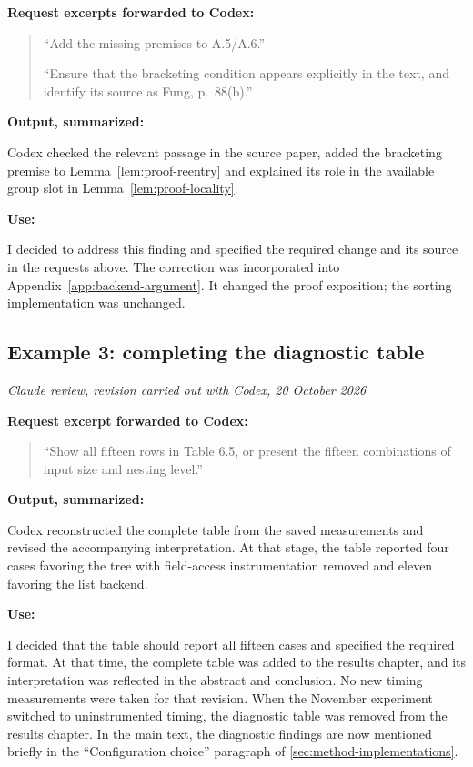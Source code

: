 \textbf{Request excerpts forwarded to Codex:}
\begin{quote}
\enquote{Add the missing premises to A.5/A.6.}

\enquote{Ensure that the bracketing condition appears explicitly in the text, and
identify its source as Fung, p.~88(b).}
\end{quote}

\textbf{Output, summarized:}

Codex checked the relevant passage in the source paper, added the bracketing
premise to Lemma~\ref{lem:proof-reentry} and explained its role in the available
group slot in Lemma~\ref{lem:proof-locality}.

\textbf{Use:}\par\nopagebreak[4]

I decided to address this finding and specified the required change and its
source in the requests above. The correction was incorporated into
Appendix~\ref{app:backend-argument}. It changed the proof exposition; the sorting
implementation was unchanged.

\subsection*{Example 3: completing the diagnostic table}
\textit{Claude review, revision carried out with Codex, 20 October 2026}

\textbf{Request excerpt forwarded to Codex:}
\begin{quote}
\enquote{Show all fifteen rows in Table 6.5, or present the fifteen combinations
of input size and nesting level.}
\end{quote}

\textbf{Output, summarized:}

Codex reconstructed the complete table from the saved measurements and revised
the accompanying interpretation. At that stage, the table reported four cases
favoring the tree with field-access instrumentation removed and eleven
favoring the list backend.

\textbf{Use:}\par\nopagebreak[4]

I decided that the table should report all fifteen cases and specified the
required format. At that time, the complete table was added to the results
chapter, and its interpretation was reflected in the abstract and conclusion.
No new timing measurements were taken for that revision. When the November
experiment switched to uninstrumented timing, the diagnostic table was removed
from the results chapter. In the main text, the diagnostic findings are now
mentioned briefly in the ``Configuration choice'' paragraph of
\cref{sec:method-implementations}.

